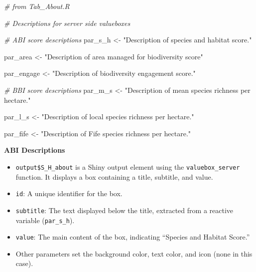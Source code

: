 \documentclass[
]{book}
\newenvironment{Shaded}{\begin{snugshade}}{\end{snugshade}}
\newcommand{\AttributeTok}[1]{\textcolor[rgb]{0.13,0.29,0.53}{#1}}
\newcommand{\CommentTok}[1]{\textcolor[rgb]{0.56,0.35,0.01}{\textit{#1}}}
\newcommand{\ConstantTok}[1]{\textcolor[rgb]{0.56,0.35,0.01}{#1}}
\newcommand{\FunctionTok}[1]{\textcolor[rgb]{0.13,0.29,0.53}{\textbf{#1}}}
\newcommand{\NormalTok}[1]{#1}
\newcommand{\OtherTok}[1]{\textcolor[rgb]{0.56,0.35,0.01}{#1}}
\newcommand{\SpecialCharTok}[1]{\textcolor[rgb]{0.81,0.36,0.00}{\textbf{#1}}}
\newcommand{\StringTok}[1]{\textcolor[rgb]{0.31,0.60,0.02}{#1}}
\begin{document}
\begin{Shaded}
\begin{Highlighting}[]
\CommentTok{\# from Tab\_About.R }

\CommentTok{\# Descriptions for server side valueboxes}

\CommentTok{\# ABI score descriptions}
\NormalTok{par\_s\_h }\OtherTok{\textless{}{-}} \StringTok{"Description of species and habitat score."}

\NormalTok{par\_area }\OtherTok{\textless{}{-}} \StringTok{"Description of area managed for biodiversity score"}

\NormalTok{par\_engage }\OtherTok{\textless{}{-}} \StringTok{"Description of biodiversity engagement score."}

\CommentTok{\# BBI score descriptions}
\NormalTok{par\_m\_s }\OtherTok{\textless{}{-}} \StringTok{"Description of mean species richness per hectare."}

\NormalTok{par\_l\_s }\OtherTok{\textless{}{-}} \StringTok{"Description of local species richness per hectare."}

\NormalTok{par\_fife }\OtherTok{\textless{}{-}} \StringTok{"Description of Fife species richness per hectare."}
\end{Highlighting}
\end{Shaded}

\textbf{ABI Descriptions}

\begin{Shaded}
\end{Shaded}

\begin{itemize}
\item
  \texttt{output\$S\_H\_about} is a Shiny output element using the \texttt{valuebox\_server} function. It displays a box containing a title, subtitle, and value.
\item
  \texttt{id}: A unique identifier for the box.
\item
  \texttt{subtitle}: The text displayed below the title, extracted from a reactive variable (\texttt{par\_s\_h}).
\item
  \texttt{value}: The main content of the box, indicating ``Species and Habitat Score.''
\item
  Other parameters set the background color, text color, and icon (none in this case).
\end{itemize}
\end{document}
